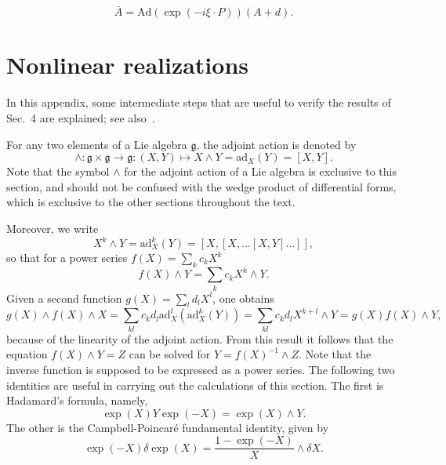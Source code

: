 \documentclass[11pt]{article}
\begin{document}
\begin{equation}
	\label{eq:A_nonlin}
	\bar{A} = \mathrm{Ad}(\exp(-i\xi\cdot P))(A + d).
\end{equation}


\section{Nonlinear realizations}
\label{app:nonlin_real}

In this appendix, some intermediate steps that are useful to 
verify the results of Sec.~4 are explained; see 
also~\cite{Zumino1977189}.

For any two elements of a Lie algebra $\mathfrak{g}$, the adjoint 
action is denoted by
\begin{displaymath}
	\wedge: \mathfrak{g} \times \mathfrak{g} \to \mathfrak{g} : 
	(X,Y) \mapsto X \wedge Y = \mathrm{ad}_X (Y) = [X,Y].
\end{displaymath}
Note that the symbol $\wedge$ for the adjoint action of a Lie 
algebra is exclusive to this section, and should not be confused 
with the wedge product of differential forms, which is exclusive 
to the other sections throughout the text.

Moreover, we write
\begin{displaymath}
	X^k \wedge Y = \mathrm{ad}_X^k (Y) = 
	[X,[X,\ldots[X,Y]\ldots]],
\end{displaymath}
so that for a power series $f(X) = \sum_k c_k X^k$
\begin{displaymath}
	f(X) \wedge Y = \sum_k c_k X^k \wedge Y.
\end{displaymath}
Given a second function $g(X) = \sum_l d_l X^l$, one obtains
\begin{displaymath}
	g(X)\wedge f(X)\wedge X = \sum_{kl} c_k d_l 
	\mathrm{ad}_X^l(\mathrm{ad}_X^k(Y)) = \sum_{kl} c_k d_l 
	X^{k+l} \wedge Y = g(X)f(X) \wedge Y,
\end{displaymath}
because of the linearity of the adjoint action.
From this result it follows that the equation $f(X) \wedge Y = Z$ 
can be solved for $Y = f(X)^{-1} \wedge Z$. Note that the inverse 
function is supposed to be expressed as a power series. The 
following two identities are useful in carrying out the 
calculations of this section. The first is Hadamard's formula, 
namely,
\begin{equation}\label{eq:Had}
	\exp(X) Y \exp(-X) = \exp(X) \wedge Y.
\end{equation}
The other is the Campbell-Poincar\'e fundamental identity, given 
by
\begin{equation}\label{eq:CP}
	\exp(-X) \delta\!\exp(X) = \frac{1-\exp(-X)}{X}\wedge \delta X.
\end{equation}
\end{document}
